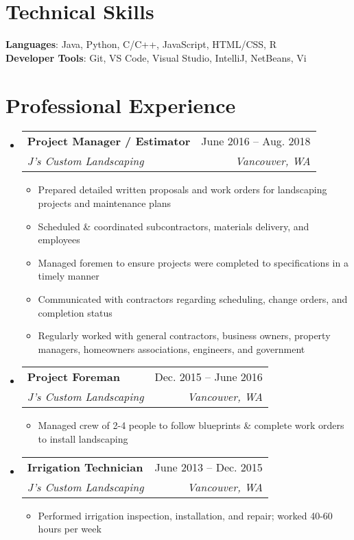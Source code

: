 \documentclass[letterpaper,11pt]{article}
\makeatletter
\newcommand{\resumeItem}[1]{
  \item\small{
    {#1 \vspace{-2pt}}
  }
}
\newcommand{\resumeSubheading}[4]{
  \vspace{-2pt}\item
    \begin{tabular*}{0.97\textwidth}[t]{l@{\extracolsep{\fill}}r}
      \textbf{#1} & #2 \\
      \textit{\small#3} & \textit{\small #4} \\
    \end{tabular*}\vspace{-7pt}
}
\newcommand{\resumeSubHeadingListStart}{\begin{itemize}[leftmargin=0.15in, label={}]}
\newcommand{\resumeSubHeadingListEnd}{\end{itemize}}
\newcommand{\resumeItemListStart}{\begin{itemize}}
\newcommand{\resumeItemListEnd}{\end{itemize}\vspace{-5pt}}
\makeatother
\begin{document}
\section{Technical Skills}
 \begin{itemize}[leftmargin=0.15in, label={}]
    \small{\item{
     \textbf{Languages}{: Java, Python, C/C++, JavaScript, HTML/CSS, R} \\
     \textbf{Developer Tools}{: Git, VS Code, Visual Studio, IntelliJ, NetBeans, Vi} \\
    }}
 \end{itemize}
\section{Professional Experience}
  \resumeSubHeadingListStart

    \resumeSubheading
      {Project Manager / Estimator}{June 2016 -- Aug. 2018}
      {J's Custom Landscaping}{Vancouver, WA}
      \resumeItemListStart
        \resumeItem{Prepared detailed written proposals and work orders for landscaping projects and maintenance plans}
        \resumeItem{Scheduled \& coordinated subcontractors, materials delivery, and employees}
        \resumeItem{Managed foremen to ensure projects were completed to specifications in a timely manner}
        \resumeItem{Communicated with contractors regarding scheduling, change orders, and completion status}
        \resumeItem{Regularly worked with general contractors, business owners, property managers, homeowners associations, engineers, and government}
      \resumeItemListEnd
      
      \resumeSubheading
      {Project Foreman}{Dec. 2015 -- June 2016}
      {J's Custom Landscaping}{Vancouver, WA}
      \resumeItemListStart
        \resumeItem{Managed crew of 2-4 people to follow blueprints \& complete work orders to install landscaping}
      \resumeItemListEnd
      
      \resumeSubheading
      {Irrigation Technician}{June 2013 -- Dec. 2015}
      {J's Custom Landscaping}{Vancouver, WA}
      \resumeItemListStart
        \resumeItem{Performed irrigation inspection, installation, and repair; worked 40-60 hours per week}
      \resumeItemListEnd
  \resumeSubHeadingListEnd

\end{document}
